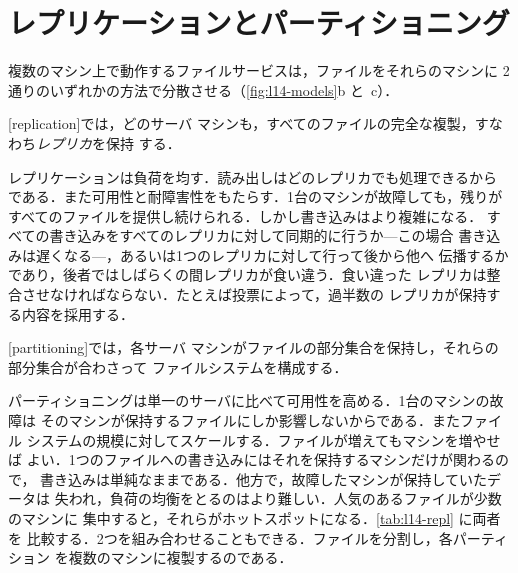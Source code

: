 \documentclass[../main.tex]{subfiles}
\begin{document}
\section{レプリケーションとパーティショニング}
\label{sec:l14-replication}

複数のマシン上で動作するファイルサービスは，ファイルをそれらのマシンに
2通りのいずれかの方法で分散させる（\cref{fig:l14-models}b と~c）．

\begin{definition}[レプリケーション]
  [replication]では，どのサーバ
  マシンも，すべてのファイルの完全な複製，すなわち\emph{レプリカ}を保持
  する．
\end{definition}

レプリケーションは負荷を均す．読み出しはどのレプリカでも処理できるから
である．また可用性と耐障害性をもたらす．1台のマシンが故障しても，残りが
すべてのファイルを提供し続けられる．しかし書き込みはより複雑になる．
すべての書き込みをすべてのレプリカに対して同期的に行うか---この場合
書き込みは遅くなる---，あるいは1つのレプリカに対して行って後から他へ
伝播するかであり，後者ではしばらくの間レプリカが食い違う．食い違った
レプリカは整合させなければならない．たとえば投票によって，過半数の
レプリカが保持する内容を採用する．

\begin{definition}[パーティショニング]
  [partitioning]では，各サーバ
  マシンがファイルの部分集合を保持し，それらの部分集合が合わさって
  ファイルシステムを構成する．
\end{definition}

パーティショニングは単一のサーバに比べて可用性を高める．1台のマシンの故障は
そのマシンが保持するファイルにしか影響しないからである．またファイル
システムの規模に対してスケールする．ファイルが増えてもマシンを増やせば
よい．1つのファイルへの書き込みにはそれを保持するマシンだけが関わるので，
書き込みは単純なままである．他方で，故障したマシンが保持していたデータは
失われ，負荷の均衡をとるのはより難しい．人気のあるファイルが少数のマシンに
集中すると，それらがホットスポットになる．\cref{tab:l14-repl} に両者を
比較する．2つを組み合わせることもできる．ファイルを分割し，各パーティション
を複数のマシンに複製するのである．%
\begin{marginfigure}
  \centering
  
  \caption{2つのパーティションを，それぞれ2台のマシンに複製した構成．}
  \label{fig:l14-combined}
\end{marginfigure}
\end{document}

